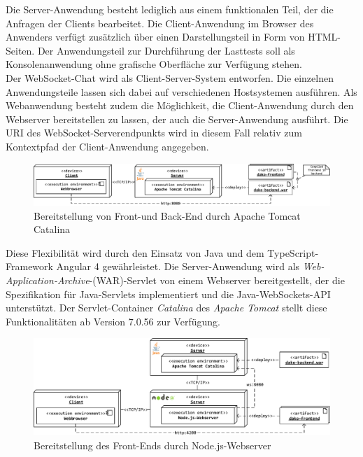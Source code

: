 \documentclass[11pt,a4paper,titlepage]{scrartcl}
\numberwithin{equation}{section}
\begin{document}
\noindent Die Server-Anwendung besteht lediglich aus einem funktionalen Teil, der die Anfragen der Clients bearbeitet. Die Client-Anwendung im Browser des Anwenders verfügt zusätzlich über einen Darstellungsteil in Form von HTML-Seiten. Der Anwendungsteil zur Durchführung der Lasttests soll als Konsolenanwendung ohne grafische Oberfläche zur Verfügung stehen.\\

\noindent Der WebSocket-Chat wird als Client-Server-System entworfen. Die einzelnen Anwendungsteile lassen sich dabei auf verschiedenen Hostsystemen ausführen. Als Webanwendung besteht zudem die Möglichkeit, die Client-Anwendung durch den Webserver bereitstellen zu lassen, der auch die Server-Anwendung ausführt. Die URI des WebSocket-Serverendpunkts wird in diesem Fall relativ zum Kontextpfad der Client-Anwendung angegeben. \\

\medskip
\begin{figure}[ht] 
	\begin{center}
		\includegraphics[scale=0.7]{img/vtfinb.pdf}
		\caption{Bereitstellung von Front-und Back-End durch Apache Tomcat Catalina}
		\label{fig:Verteilung1}
	\end{center}
\end{figure}

\noindent Diese Flexibilität wird durch den Einsatz von Java und dem TypeScript-Framework Angular 4 gewährleistet. Die Server-Anwendung wird als \textit{Web-Application-Archive}-(WAR)-Servlet von einem Webserver bereitgestellt, der die Spezifikation für Java-Servlets implementiert und die Java-WebSockets-API unterstützt. Der Servlet-Container \textit{Catalina} des \textit{Apache Tomcat} stellt diese Funktionalitäten ab Version 7.0.56 zur Verfügung.\\

\medskip
\begin{figure}[ht] 
	\begin{center}
		\includegraphics[scale=0.8]{img/vtfohneb.pdf}
		\caption{Bereitstellung des Front-Ends durch Node.js-Webserver}
		\label{fig:Verteilung2}
	\end{center}
\end{figure}
\end{document}
